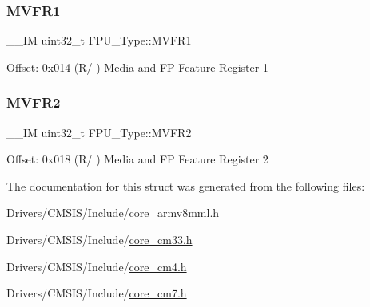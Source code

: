 \subsubsection{\texorpdfstring{M\+V\+F\+R1}{MVFR1}}
{\footnotesize\ttfamily \+\_\+\+\_\+\+IM uint32\+\_\+t F\+P\+U\+\_\+\+Type\+::\+M\+V\+F\+R1}

Offset\+: 0x014 (R/ ) Media and FP Feature Register 1 \mbox{\label{struct_f_p_u___type_a479130e53a8b3c36fd8ee38b503a3911}} 
\subsubsection{\texorpdfstring{M\+V\+F\+R2}{MVFR2}}
{\footnotesize\ttfamily \+\_\+\+\_\+\+IM uint32\+\_\+t F\+P\+U\+\_\+\+Type\+::\+M\+V\+F\+R2}

Offset\+: 0x018 (R/ ) Media and FP Feature Register 2 

The documentation for this struct was generated from the following files\+:\begin{DoxyCompactItemize}
\item 
Drivers/\+C\+M\+S\+I\+S/\+Include/\hyperlink{core__armv8mml_8h}{core\+\_\+armv8mml.\+h}\item 
Drivers/\+C\+M\+S\+I\+S/\+Include/\hyperlink{core__cm33_8h}{core\+\_\+cm33.\+h}\item 
Drivers/\+C\+M\+S\+I\+S/\+Include/\hyperlink{core__cm4_8h}{core\+\_\+cm4.\+h}\item 
Drivers/\+C\+M\+S\+I\+S/\+Include/\hyperlink{core__cm7_8h}{core\+\_\+cm7.\+h}\end{DoxyCompactItemize}
